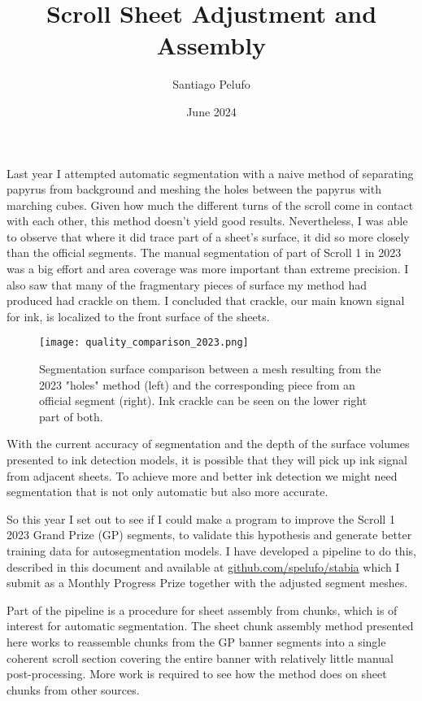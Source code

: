 \documentclass{article}
\title{Scroll Sheet Adjustment and Assembly}
\author{Santiago Pelufo}
\date{June 2024}
\begin{document}
\maketitle

Last year I attempted automatic segmentation with a naive method of separating papyrus from background and meshing the holes between the papyrus with marching cubes. Given how much the different turns of the scroll come in contact with each other, this method doesn't yield good results. Nevertheless, I was able to observe that where it did trace part of a sheet's surface, it did so more closely than the official segments. The manual segmentation of part of Scroll 1 in 2023 was a big effort and area coverage was more important than extreme precision. I also saw that many of the fragmentary pieces of surface my method had produced had crackle on them. I concluded that crackle, our main known signal for ink, is localized to the front surface of the sheets. 

\begin{figure}
    \centering
    \texttt{[image: quality\_comparison\_2023.png]}
    \caption{Segmentation surface comparison between a mesh resulting from the 2023 "holes" method (left) and the corresponding piece from an official segment (right). Ink crackle can be seen on the lower right part of both.}
    \label{quality-comparison-2023}
\end{figure}

With the current accuracy of segmentation and the depth of the surface volumes presented to ink detection models, it is possible that they will pick up ink signal from adjacent sheets. To achieve more and better ink detection we might need segmentation that is not only automatic but also more accurate.

So this year I set out to see if I could make a program to improve the Scroll 1 2023 Grand Prize (GP) segments, to validate this hypothesis and generate better training data for autosegmentation models. I have developed a pipeline to do this, described in this document and available at \href{https://github.com/spelufo/stabia}{github.com/spelufo/stabia} which I submit as a Monthly Progress Prize together with the adjusted segment meshes.

Part of the pipeline is a procedure for sheet assembly from chunks, which is of interest for automatic segmentation. The sheet chunk assembly method presented here works to reassemble chunks from the GP banner segments into a single coherent scroll section covering the entire banner with relatively little manual post-processing. More work is required to see how the method does on sheet chunks from other sources.
\end{document}
